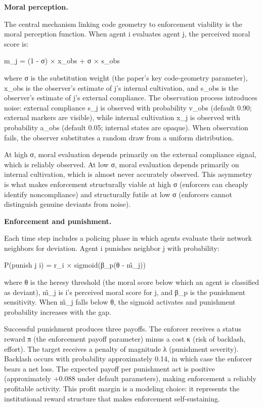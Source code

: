 \documentclass[12pt]{article}
\begin{document}
\textbf{Moral perception.}

The central mechanism linking code geometry to enforcement viability is the moral perception function. When agent i evaluates agent j, the perceived moral score is:

m\_j = (1 - σ) × x\_obs + σ × s\_obs

where σ is the substitution weight (the paper's key code-geometry parameter), x\_obs is the observer's estimate of j's internal cultivation, and s\_obs is the observer's estimate of j's external compliance. The observation process introduces noise: external compliance s\_j is observed with probability v\_obs (default 0.90; external markers are visible), while internal cultivation x\_j is observed with probability a\_obs (default 0.05; internal states are opaque). When observation fails, the observer substitutes a random draw from a uniform distribution.

At high σ, moral evaluation depends primarily on the external compliance signal, which is reliably observed. At low σ, moral evaluation depends primarily on internal cultivation, which is almost never accurately observed. This asymmetry is what makes enforcement structurally viable at high σ (enforcers can cheaply identify noncompliance) and structurally futile at low σ (enforcers cannot distinguish genuine deviants from noise).

%

\textbf{Enforcement and punishment.}

Each time step includes a policing phase in which agents evaluate their network neighbors for deviation. Agent i punishes neighbor j with probability:

P(punish j \textbar{} i) = r\_i × sigmoid(β\_p(θ - m̂\_j))

where θ is the heresy threshold (the moral score below which an agent is classified as deviant), m̂\_j is i's perceived moral score for j, and β\_p is the punishment sensitivity. When m̂\_j falls below θ, the sigmoid activates and punishment probability increases with the gap.

Successful punishment produces three payoffs. The enforcer receives a status reward π (the enforcement payoff parameter) minus a cost κ (risk of backlash, effort). The target receives a penalty of magnitude λ (punishment severity). Backlash occurs with probability approximately 0.14, in which case the enforcer bears a net loss. The expected payoff per punishment act is positive (approximately +0.088 under default parameters), making enforcement a reliably profitable activity. This profit margin is a modeling choice: it represents the institutional reward structure that makes enforcement self-sustaining.
\end{document}
